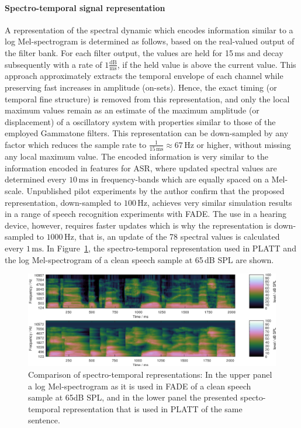 \documentclass[10pt,a4paper,twocolumn]{article}
\begin{document}
\paragraph{Spectro-temporal signal representation}
%
A representation of the spectral dynamic which encodes information similar to a log Mel-spectrogram is determined as follows, based on the real-valued output of the filter bank.
%
For each filter output, the values are held for 15\,ms and decay subsequently with a rate of $1\frac{\text{dB}}{\text{ms}}$, if the held value is above the current value.
%
This approach approximately extracts the temporal envelope of each channel while preserving fast increases in amplitude (on-sets).
%
Hence, the exact timing (or temporal fine structure) is removed from this representation, and only the local maximum values remain as an estimate of the maximum amplitude (or displacement) of a oscillatory system with properties similar to those of the employed Gammatone filters.
%
This representation can be down-sampled by any factor which reduces the sample rate to $\frac{1}{15\,\text{ms}}\approx67\,\text{Hz}$ or higher, without missing any local maximum value.
%
The encoded information is very similar to the information encoded in features for ASR, where updated spectral values are determined every $10\,\text{ms}$ in frequency-bands which are equally spaced on a Mel-scale.
%
Unpublished pilot experiments by the author confirm that the proposed representation, down-sampled to $100\,\text{Hz}$, achieves very similar simulation results in a range of speech recognition experiments with FADE.
%
The use in a hearing device, however, requires faster updates which is why the representation is down-sampled to $1000\,\text{Hz}$, that is, an update of the 78 spectral values is calculated every $1\,\text{ms}$.
%
In Figure~\ref{fig:7}, the spectro-temporal representation used in PLATT and the log Mel-spectrogram of a clean speech sample at 65\,dB SPL are shown.
%
\begin{figure}[h]
	\centerline{\includegraphics[width=1.0\textwidth]{images/logms-plattstr}}
	\caption{Comparison of spectro-temporal representations: In the upper panel a log Mel-spectrogram as it is used in FADE of a clean speech sample at 65dB SPL, and in the lower panel the presented specto-temporal representation that is used in PLATT of the same sentence.}
	\label{fig:7}
\end{figure}
\end{document}
